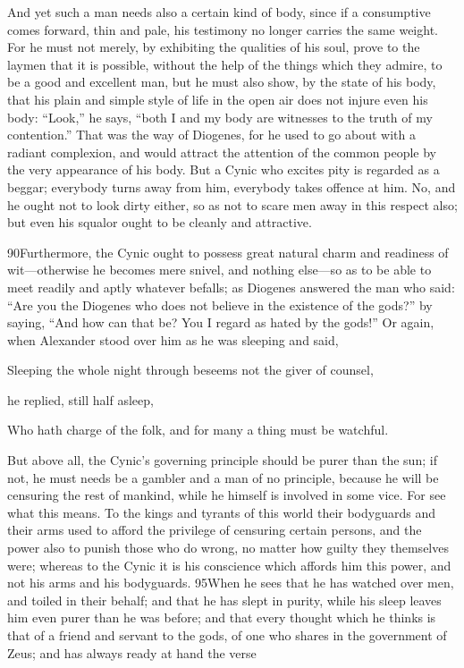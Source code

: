 And yet such a man needs also a certain kind of body, since if a consumptive comes forward, thin and pale, his testimony no longer carries the same weight. For he must not merely, by exhibiting the qualities of his soul, prove to the laymen that it is possible, without the help of the things which they admire, to be a good and excellent man, but he must also show, by the state of his body, that his plain and simple style of life in the open air does not injure even his body: ``Look,'' he says, ``both I and my body are witnesses to the truth of my contention.'' That was the way of Diogenes, for he used to go about with a radiant complexion, and would attract the attention of the common people by the very appearance of his body. But a Cynic who excites pity is regarded as a beggar; everybody turns away from him, everybody takes offence at him. No, and he ought not to look dirty either, so as not to scare men away in this respect also; but even his squalor ought to be cleanly and attractive.

90Furthermore, the Cynic ought to possess great natural charm and readiness of wit—otherwise he becomes mere snivel, and nothing else—so as to be able to meet readily and aptly whatever befalls; as Diogenes answered the man who said: ``Are you the Diogenes who does not believe in the existence of the gods?'' by saying, ``And how can that be? You I regard as hated by the gods!'' Or again, when Alexander stood over him as he was sleeping and said,

Sleeping the whole night through beseems not the giver of counsel,

he replied, still half asleep,

Who hath charge of the folk, and for many a thing must be watchful.

But above all, the Cynic's governing principle should be purer than the sun; if not, he must needs be a gambler and a man of no principle, because he will be censuring the rest of mankind, while he himself is involved in some vice. For see what this means. To the kings and tyrants of this world their bodyguards and their arms used to afford the privilege of censuring certain persons, and the power also to punish those who do wrong, no matter how guilty they themselves were; whereas to the Cynic it is his conscience which affords him this power, and not his arms and his bodyguards. 95When he sees that he has watched over men, and toiled in their behalf; and that he has slept in purity, while his sleep leaves him even purer than he was before; and that every thought which he thinks is that of a friend and servant to the gods, of one who shares in the government of Zeus; and has always ready at hand the verse


